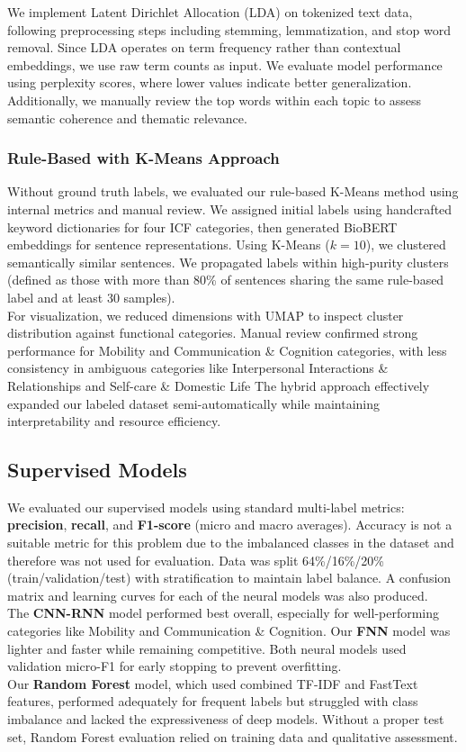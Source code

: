 We implement Latent Dirichlet Allocation (LDA) on tokenized text data, following preprocessing steps including stemming, lemmatization, and stop word removal. Since LDA operates on term frequency rather than contextual embeddings, we use raw term counts as input. We evaluate model performance using perplexity scores, where lower values indicate better generalization. Additionally, we manually review the top words within each topic to assess semantic coherence and thematic relevance.

\subsubsection{Rule-Based with K-Means Approach}

Without ground truth labels, we evaluated our rule-based K-Means method using internal metrics and manual review. We assigned initial labels using handcrafted keyword dictionaries for four ICF categories, then generated BioBERT embeddings for sentence representations. Using K-Means ($k=10$), we clustered semantically similar sentences. We propagated labels within high-purity clusters (defined as those with more than 80\% of sentences sharing the same rule-based label and at least 30 samples). \\

For visualization, we reduced dimensions with UMAP to inspect cluster distribution against functional categories. Manual review confirmed strong performance for Mobility and Communication \& Cognition categories, with less consistency in ambiguous categories like Interpersonal Interactions \& Relationships and Self-care \& Domestic Life The hybrid approach effectively expanded our labeled dataset semi-automatically while maintaining interpretability and resource efficiency.


\subsection{Supervised Models}

We evaluated our supervised models using standard multi-label metrics: \textbf{precision}, \textbf{recall}, and \textbf{F1-score} (micro and macro averages). Accuracy is not a suitable metric for this problem due to the imbalanced classes in the dataset and therefore was not used for evaluation. Data was split 64\%/16\%/20\% (train/validation/test) with stratification to maintain label balance. A confusion matrix and learning curves for each of the neural models was also produced. \\

The \textbf{CNN-RNN} model performed best overall, especially for well-performing categories like Mobility and Communication \& Cognition. Our \textbf{FNN} model was lighter and faster while remaining competitive. Both neural models used validation micro-F1 for early stopping to prevent overfitting.\\

Our \textbf{Random Forest} model, which used combined TF-IDF and FastText features, performed adequately for frequent labels but struggled with class imbalance and lacked the expressiveness of deep models. Without a proper test set, Random Forest evaluation relied on training data and qualitative assessment.
